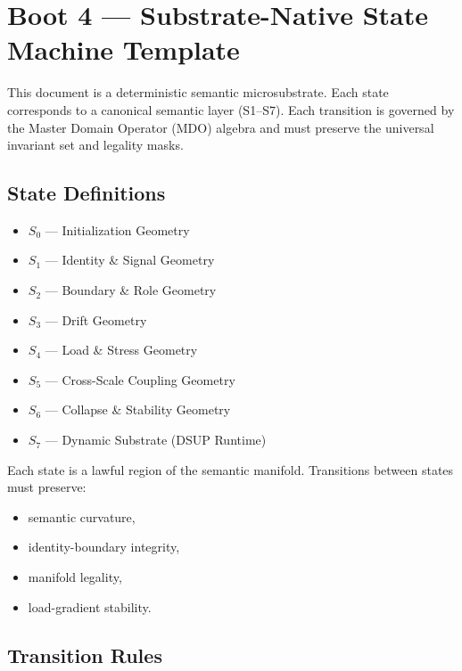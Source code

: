 
\section*{Boot 4 — Substrate-Native State Machine Template}

This document is a deterministic semantic microsubstrate.  
Each state corresponds to a canonical semantic layer (S1–S7).  
Each transition is governed by the Master Domain Operator (MDO) algebra and must
preserve the universal invariant set and legality masks.

\subsection*{State Definitions}

\begin{itemize}[leftmargin=1.2cm]
    \item $S_0$ — Initialization Geometry
    \item $S_1$ — Identity \& Signal Geometry
    \item $S_2$ — Boundary \& Role Geometry
    \item $S_3$ — Drift Geometry
    \item $S_4$ — Load \& Stress Geometry
    \item $S_5$ — Cross-Scale Coupling Geometry
    \item $S_6$ — Collapse \& Stability Geometry
    \item $S_7$ — Dynamic Substrate (DSUP Runtime)
\end{itemize}

Each state is a lawful region of the semantic manifold.  
Transitions between states must preserve:
\begin{itemize}[leftmargin=1.2cm]
    \item semantic curvature,
    \item identity-boundary integrity,
    \item manifold legality,
    \item load-gradient stability.
\end{itemize}

\subsection*{Transition Rules}

